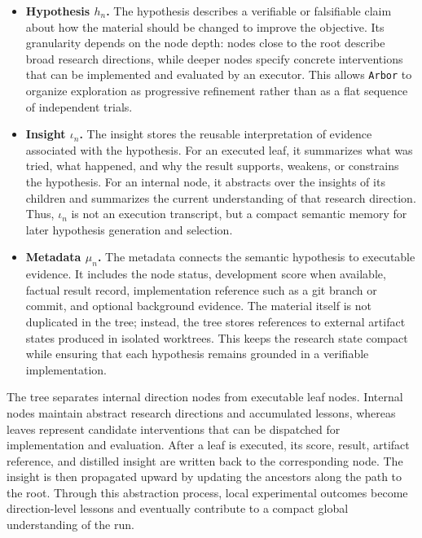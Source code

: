 \documentclass[]{selfevolagent}
\theoremstyle{plain}
\theoremstyle{definition}
\theoremstyle{remark}
\newcommand{\arbor}{\texttt{Arbor}}
\begin{document}
\begin{itemize}
    \item \textbf{Hypothesis $h_n$.} 
    The hypothesis describes a verifiable or falsifiable claim about how the material should be changed to improve the objective. Its granularity depends on the node depth: nodes close to the root describe broad research directions, while deeper nodes specify concrete interventions that can be implemented and evaluated by an executor. This allows \arbor{} to organize exploration as progressive refinement rather than as a flat sequence of independent trials.

    \item \textbf{Insight $\iota_n$.} 
    The insight stores the reusable interpretation of evidence associated with the hypothesis. For an executed leaf, it summarizes what was tried, what happened, and why the result supports, weakens, or constrains the hypothesis. For an internal node, it abstracts over the insights of its children and summarizes the current understanding of that research direction. Thus, $\iota_n$ is not an execution transcript, but a compact semantic memory for later hypothesis generation and selection.

    \item \textbf{Metadata $\mu_n$.} 
    The metadata connects the semantic hypothesis to executable evidence. It includes the node status, development score when available, factual result record, implementation reference such as a git branch or commit, and optional background evidence. The material itself is not duplicated in the tree; instead, the tree stores references to external artifact states produced in isolated worktrees. This keeps the research state compact while ensuring that each hypothesis remains grounded in a verifiable implementation.
\end{itemize}

The tree separates internal direction nodes from executable leaf nodes. Internal nodes maintain abstract research directions and accumulated lessons, whereas leaves represent candidate interventions that can be dispatched for implementation and evaluation. After a leaf is executed, its score, result, artifact reference, and distilled insight are written back to the corresponding node. The insight is then propagated upward by updating the ancestors along the path to the root. Through this abstraction process, local experimental outcomes become direction-level lessons and eventually contribute to a compact global understanding of the run.
\end{document}

